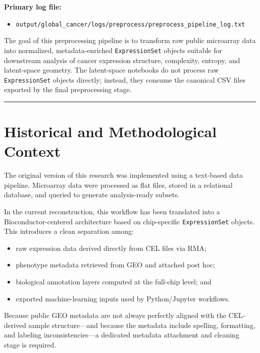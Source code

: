 \documentclass[
  letterpaper,
  DIV=11,
  numbers=noendperiod,
  openany,
  oneside]{scrreprt}
\providecommand{\tightlist}{%
  \setlength{\itemsep}{0pt}\setlength{\parskip}{0pt}}
\begin{document}
\textbf{Primary log file:}

\begin{itemize}
\tightlist
\item
  \texttt{output/global\_cancer/logs/preprocess/preprocess\_pipeline\_log.txt}
\end{itemize}

The goal of this preprocessing pipeline is to transform raw public
microarray data into normalized, metadata-enriched
\texttt{ExpressionSet} objects suitable for downstream analysis of
cancer expression structure, complexity, entropy, and latent-space
geometry. The latent-space notebooks do not process raw
\texttt{ExpressionSet} objects directly; instead, they consume the
canonical CSV files exported by the final preprocessing stage.

\begin{center}\rule{0.5\linewidth}{0.5pt}\end{center}

\section*{Historical and Methodological
Context}\label{historical-and-methodological-context}


The original version of this research was implemented using a text-based
data pipeline. Microarray data were processed as flat files, stored in a
relational database, and queried to generate analysis-ready subsets.

In the current reconstruction, this workflow has been translated into a
Bioconductor-centered architecture based on chip-specific
\texttt{ExpressionSet} objects. This introduces a clean separation
among:

\begin{itemize}
\tightlist
\item
  raw expression data derived directly from CEL files via RMA;
\item
  phenotype metadata retrieved from GEO and attached post hoc;
\item
  biological annotation layers computed at the full-chip level; and
\item
  exported machine-learning inputs used by Python/Jupyter workflows.
\end{itemize}

Because public GEO metadata are not always perfectly aligned with the
CEL-derived sample structure---and because the metadata include
spelling, formatting, and labeling inconsistencies---a dedicated
metadata attachment and cleaning stage is required.
\end{document}

